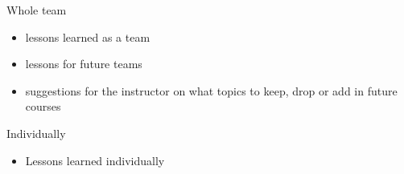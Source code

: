 Whole team
\begin{itemize}
\item lessons learned as a team
\item lessons for future teams
\item suggestions for the instructor on what topics to keep, drop or add in future courses
\end{itemize}
Individually
\begin{itemize}
\item Lessons learned individually
\end{itemize}
